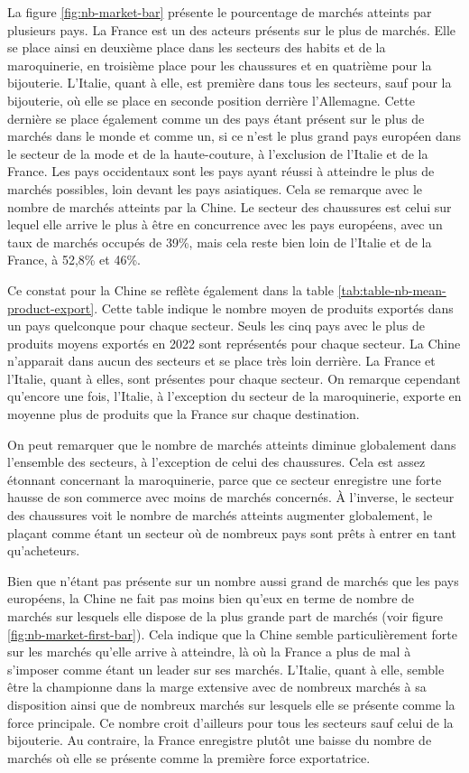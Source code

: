 \documentclass[french,10pt,a4paper]{article}
\begin{document}
La figure \ref{fig:nb-market-bar} présente le pourcentage de marchés atteints par plusieurs pays. La France est un des acteurs présents sur le plus de marchés. Elle se place ainsi en deuxième place dans les secteurs des habits et de la maroquinerie, en troisième place pour les chaussures et en quatrième pour la bijouterie. L'Italie, quant à elle, est première dans tous les secteurs, sauf pour la bijouterie, où elle se place en seconde position derrière l'Allemagne. Cette dernière se place également comme un des pays étant présent sur le plus de marchés dans le monde et comme un, si ce n'est le plus grand pays européen dans le secteur de la mode et de la haute-couture, à l'exclusion de l'Italie et de la France. Les pays occidentaux sont les pays ayant réussi à atteindre le plus de marchés possibles, loin devant les pays asiatiques. Cela se remarque avec le nombre de marchés atteints par la Chine. Le secteur des chaussures est celui sur lequel elle arrive le plus à être en concurrence avec les pays européens, avec un taux de marchés occupés de 39\%, mais cela reste bien loin de l'Italie et de la France, à 52,8\% et 46\%.

Ce constat pour la Chine se reflète également dans la table \ref{tab:table-nb-mean-product-export}. Cette table indique le nombre moyen de produits exportés dans un pays quelconque pour chaque secteur. Seuls les cinq pays avec le plus de produits moyens exportés en 2022 sont représentés pour chaque secteur. La Chine n'apparait dans aucun des secteurs et se place très loin derrière. La France et l'Italie, quant à elles, sont présentes pour chaque secteur. On remarque cependant qu'encore une fois, l'Italie, à l'exception du secteur de la maroquinerie, exporte en moyenne plus de produits que la France sur chaque destination.

On peut remarquer que le nombre de marchés atteints diminue globalement dans l'ensemble des secteurs, à l'exception de celui des chaussures. Cela est assez étonnant concernant la maroquinerie, parce que ce secteur enregistre une forte hausse de son commerce avec moins de marchés concernés. À l'inverse, le secteur des chaussures voit le nombre de marchés atteints augmenter globalement, le plaçant comme étant un secteur où de nombreux pays sont prêts à entrer en tant qu'acheteurs. 

Bien que n'étant pas présente sur un nombre aussi grand de marchés que les pays européens, la Chine ne fait pas moins bien qu'eux en terme de nombre de marchés sur lesquels elle dispose de la plus grande part de marchés (voir figure \ref{fig:nb-market-first-bar}). Cela indique que la Chine semble particulièrement forte sur les marchés qu'elle arrive à atteindre, là où la France a plus de mal à s'imposer comme étant un leader sur ses marchés. L'Italie, quant à elle, semble être la championne dans la marge extensive avec de nombreux marchés à sa disposition ainsi que de nombreux marchés sur lesquels elle se présente comme la force principale. Ce nombre croit d'ailleurs pour tous les secteurs sauf celui de la bijouterie. Au contraire, la France enregistre plutôt une baisse du nombre de marchés où elle se présente comme la première force exportatrice.
\end{document}
